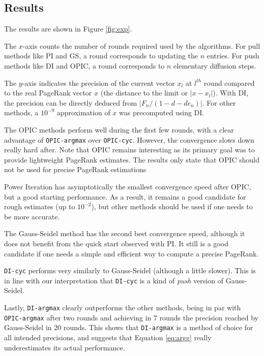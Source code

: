 \documentclass{llncs}
\begin{document}
\subsection{Results}

The results are shown in Figure \ref{fig:exp}.




The $x$-axis counts the number of rounds required used by the algorithms. For pull methods like PI and GS, a round corresponds to updating the $ n $ entries. For push methods like DI and OPIC, a round corresponds to $ n $ elementary diffusion steps.



The $y$-axis indicates the precision of the current vector $x_l$ at $l^{th}$ round compared to the real PageRank vector $x$ (the distance to the limit or $|x-x_l|$). With DI, the precision can be directly deduced from $|F_n/(1-d-de_n)|$. For other methods, a $10^{-9}$ approximation of $x$ was precomputed using DI.

The OPIC methods perform well during the first few rounds, with a clear advantage of \texttt{OPIC-argmax} over \texttt{OPIC-cyc}. However, the convergence slows down really hard after. Note that OPIC remains interesting as its primary goal was to provide lightweight PageRank estimates. The results only state that OPIC should not be used for precise PageRank estimations

Power Iteration has asymptotically the smallest convergence speed after OPIC, but a good starting performance. As a result, it remains a good candidate for rough estimates (up to $ 10^{-2} $), but other methods should be used if one needs to be more accurate.

The Gauss-Seidel method has the second best convergence speed, although it does not benefit from the quick start observed with PI. It still is a good candidate if one needs a simple and efficient way to compute a precise PageRank.

\texttt{DI-cyc} performs very similarly to Gauss-Seidel (although a little slower). This is in line with our interpretation that \texttt{DI-cyc} is a kind of \emph{push} version of Gauss-Seidel.

Lastly, \texttt{DI-argmax} clearly outperforms the other methods, being in par with \texttt{OPIC-argmax} after two rounds and achieving in 7 rounds the precision reached by Gauss-Seidel in 20 rounds. This shows that \texttt{DI-argmax} is a method of choice for all intended precisions, and suggests that Equation \eqref{eq:argg} really underestimates its actual performance.
\end{document}
